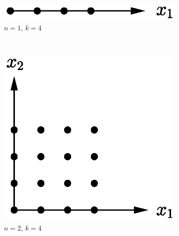 \begin{figure}[t]
    \centering
    \begin{subfigure}[b]{0.32\textwidth}
    \centering
        \includegraphics[scale=0.55]{../img/Construccion_de_un_Metamodelo/dimensionality1.eps}
        \caption{$n=1$, $k=4$}
        \label{fig:dimensionality1}
    \end{subfigure}
    ~ %
    \begin{subfigure}[b]{0.32\textwidth}
    \centering
        \includegraphics[scale=0.55]{../img/Construccion_de_un_Metamodelo/dimensionality2.eps}
        \caption{$n=2$, $k=4$}
        \label{fig:dimensionality2}
    \end{subfigure}
    \begin{subfigure}[b]{0.32\textwidth}
    \centering

\end{subfigure}
\end{figure}
